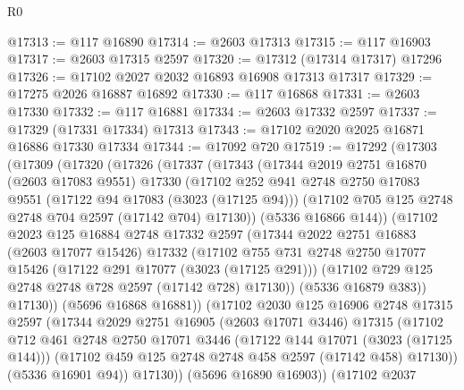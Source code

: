 \begin{lexlean}{R0}
\begin{coremodule}
@17313 := @117 @16890
@17314 := @2603 @17313
@17315 := @117 @16903
@17317 := @2603 @17315 @2597
@17320 := @17312 (@17314 @17317) @17296
@17326 := @17102 @2027 @2032 @16893 @16908 @17313 @17317
@17329 := @17275 @2026 @16887 @16892
@17330 := @117 @16868
@17331 := @2603 @17330
@17332 := @117 @16881
@17334 := @2603 @17332 @2597
@17337 := @17329 (@17331 @17334) @17313
@17343 := @17102 @2020 @2025 @16871 @16886 @17330 @17334
@17344 := @17092 @720
@17519 := @17292
    (@17303
      (@17309
        (@17320
          (@17326
            (@17337
              (@17343
                (@17344
                  @2019
                  @2751
                  @16870
                  (@2603 @17083 @9551)
                  @17330
                  (@17102
                    @252
                    @941
                    @2748
                    @2750
                    @17083
                    @9551
                    (@17122 @94 @17083 (@3023 (@17125 @94)))
                    (@17102 @705 @125 @2748 @2748 @704 @2597 (@17142 @704) @17130))
                  (@5336 @16866 @144))
                (@17102
                  @2023
                  @125
                  @16884
                  @2748
                  @17332
                  @2597
                  (@17344
                    @2022
                    @2751
                    @16883
                    (@2603 @17077 @15426)
                    @17332
                    (@17102
                      @755
                      @731
                      @2748
                      @2750
                      @17077
                      @15426
                      (@17122 @291 @17077 (@3023 (@17125 @291)))
                      (@17102 @729 @125 @2748 @2748 @728 @2597 (@17142 @728) @17130))
                    (@5336 @16879 @383))
                  @17130))
              (@5696 @16868 @16881))
            (@17102
              @2030
              @125
              @16906
              @2748
              @17315
              @2597
              (@17344
                @2029
                @2751
                @16905
                (@2603 @17071 @3446)
                @17315
                (@17102
                  @712
                  @461
                  @2748
                  @2750
                  @17071
                  @3446
                  (@17122 @144 @17071 (@3023 (@17125 @144)))
                  (@17102 @459 @125 @2748 @2748 @458 @2597 (@17142 @458) @17130))
                (@5336 @16901 @94))
              @17130))
          (@5696 @16890 @16903))
        (@17102
          @2037

\end{coremodule}
\end{lexlean}
